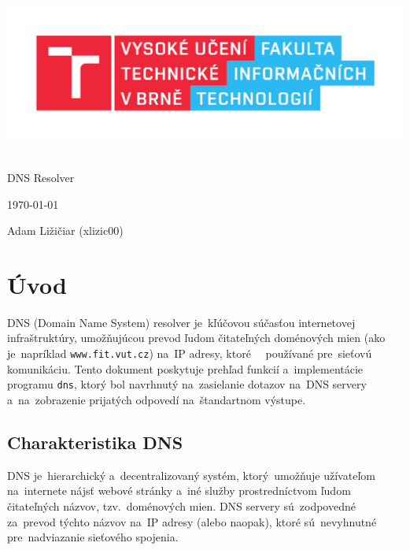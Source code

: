 \documentclass[a4paper, 11pt]{article}
\begin{document}
	\begin{titlepage}
		\begin{center}
			\includegraphics[width=0.77\linewidth]{res/logo_FIT.pdf} \\


			 \\
			\LARGE{DNS Resolver} \\
		\end{center}

		\begin{minipage}[b]{0.4 \textwidth}
			\raggedright
			{\Large \today}
		\end{minipage}
		\hfill
		\begin{minipage}[b]{0.6 \textwidth}
			\raggedleft
			\Large
			Adam Ližičiar (xlizic00)\\
		\end{minipage}		
	\end{titlepage}

	\setcounter{page}{1}
	\tableofcontents
	\clearpage

	\setcounter{page}{1}
	
	\section{Úvod}
	DNS (Domain Name System) resolver je~kľúčovou súčasťou internetovej infraštruktúry, umožňujúcou prevod ľudom čitateľných doménových mien (ako je~napríklad \texttt{www.fit.vut.cz}) na~IP adresy, ktoré~ ~používané pre~sieťovú komunikáciu. Tento dokument poskytuje prehľad funkcií a~implementácie programu \texttt{dns}, ktorý bol navrhnutý na~zasielanie dotazov na~DNS servery a~na~zobrazenie prijatých odpovedí na~štandartnom výstupe.
	\subsection{Charakteristika DNS}
	DNS je~hierarchický a~decentralizovaný systém, ktorý~umožňuje užívateľom na~internete nájsť webové stránky a~iné služby prostredníctvom ľudom čitateľných názvov, tzv.~doménových mien. DNS servery sú~zodpovedné za~prevod týchto názvov na~IP adresy (alebo naopak), ktoré sú~nevyhnutné pre~nadviazanie sieťového spojenia.
\end{document}
